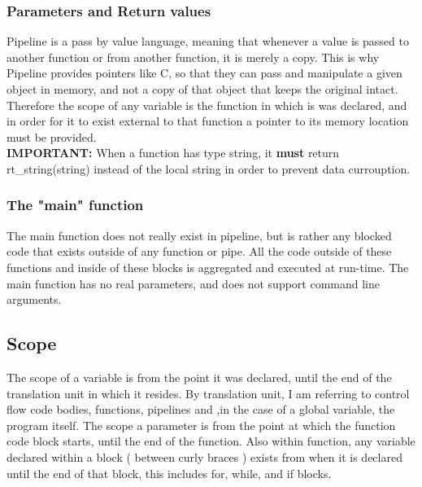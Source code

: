 \documentclass[./Report_main.tex]{subfiles}
\begin{document}
\subsubsection{Parameters and Return values}
Pipeline is a pass by value language, meaning that whenever a value is passed to another function or from another function, it is merely a copy. This is why Pipeline provides pointers like C, so that they can pass and manipulate a given object in memory, and not a copy of that object that keeps the original intact. Therefore the scope of any variable is the function in which is was declared, and in order for it to exist external to that function a pointer to its memory location must be provided.\\
\textbf{IMPORTANT:} When a function has type string, it \textbf{must} return rt\_string(string) instead of the local string in order to prevent data currouption.\\
\subsubsection{The "main" function}
The main function does not really exist in pipeline, but is rather any blocked code that exists outside of any function or pipe. All the code outside of these functions and inside of these blocks is aggregated and executed at run-time. The main function has no real parameters, and does not support command line arguments.
\subsection{Scope}
The scope of a variable is from the point it was declared, until the end of the translation unit in which it resides. By translation unit, I am referring to control flow code bodies, functions, pipelines and ,in the case of a global variable, the program itself. The scope a parameter is from the point at which the function code block starts, until the end of the function. Also within function, any variable declared within a block ( between curly braces ) exists from when it is declared until the end of that block, this includes for, while, and if blocks.
\end{document}
